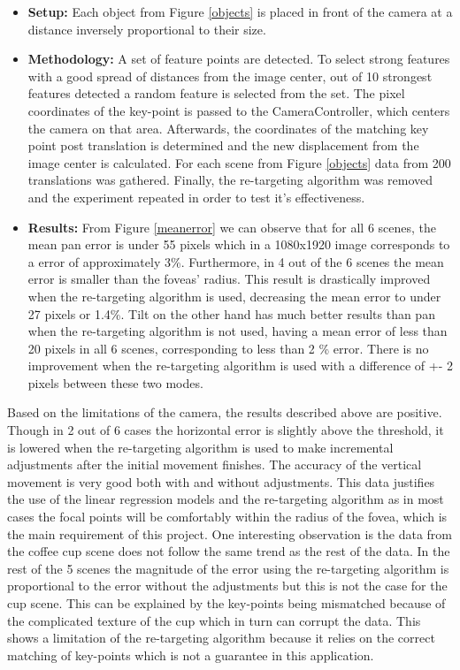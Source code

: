 \documentclass{l4proj}
\begin{document}
\begin{itemize}
    \item \textbf{Setup:} Each object from Figure \ref{objects} is placed in front of the camera at a distance inversely proportional to their size. 
    
    \item \textbf{Methodology:} A set of feature points are detected. To select strong features with a good spread of distances from the image center, out of 10 strongest features detected a random feature is selected from the set. The pixel coordinates of the key-point is passed to the CameraController, which centers the camera on that area. Afterwards, the coordinates of the matching key point post translation is determined and the new displacement from the image center is calculated. For each scene from Figure \ref{objects} data from 200 translations was gathered. Finally, the re-targeting algorithm was removed and the experiment repeated in order to test it's effectiveness.
    
    
    \item \textbf{Results:}  From Figure \ref{meanerror} we can observe that for all 6 scenes, the mean pan error is under 55 pixels which in a 1080x1920 image corresponds to a error of approximately 3\%. Furthermore, in 4 out of the 6 scenes the mean error is smaller than the foveas' radius. This result is drastically improved when the re-targeting algorithm is used, decreasing the mean error to under 27 pixels or 1.4\%. Tilt on the other hand has much better results than pan when the re-targeting algorithm is not used, having a mean error of less than 20 pixels in all 6 scenes, corresponding to less than 2 \% error. There is no improvement when the re-targeting algorithm is used with a difference of +- 2 pixels between these two modes. 
    
\end{itemize}

Based on the limitations of the camera, the results described above are positive. Though in 2 out of 6 cases the horizontal error is slightly above the threshold, it is lowered when the re-targeting algorithm is used to make incremental adjustments after the initial movement finishes. The accuracy of the vertical movement is very good both with and without adjustments. This data justifies the use of the linear regression models and the re-targeting algorithm as in most cases the focal points will be comfortably within the radius of the fovea, which is the main requirement of this project. One interesting observation is the data from the coffee cup scene does not follow the same trend as the rest of the data. In the rest of the 5 scenes the magnitude of the error using the re-targeting algorithm is proportional to the error without the adjustments but this is not the case for the cup scene. This can be explained by the key-points being mismatched because of the complicated texture of the cup which in turn can corrupt the data. This shows a limitation of the re-targeting algorithm because it relies on the correct matching of key-points which is not a guarantee in this application. 
\end{document}
